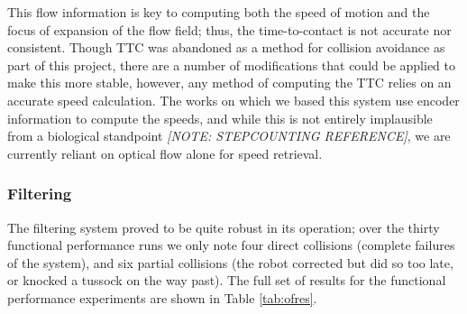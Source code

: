 \documentclass[a4paper,12pt]{article}
\begin{document}
This flow information is key to computing both the speed of motion and the focus of expansion of the flow field; thus, the
time-to-contact is not accurate nor consistent. Though TTC was abandoned as a method for collision avoidance as part of this
project, there are a number of modifications that could be applied to make this more stable, however, any method of computing the
TTC relies on an accurate speed calculation. The works on which we based this system use encoder information to compute the
speeds, and while this is not entirely implausible from a biological standpoint \textit{[NOTE: STEPCOUNTING REFERENCE]}, we are currently
reliant on optical flow alone for speed retrieval. 

\subsubsection{Filtering}
The filtering system proved to be quite robust in its operation; over the thirty functional performance runs we only note four direct
collisions (complete failures of the system), and six partial collisions (the robot corrected but did so too late, or knocked a
tussock on the way past). The full set of results for the functional performance experiments are shown in Table \ref{tab:ofres}.
\end{document}

